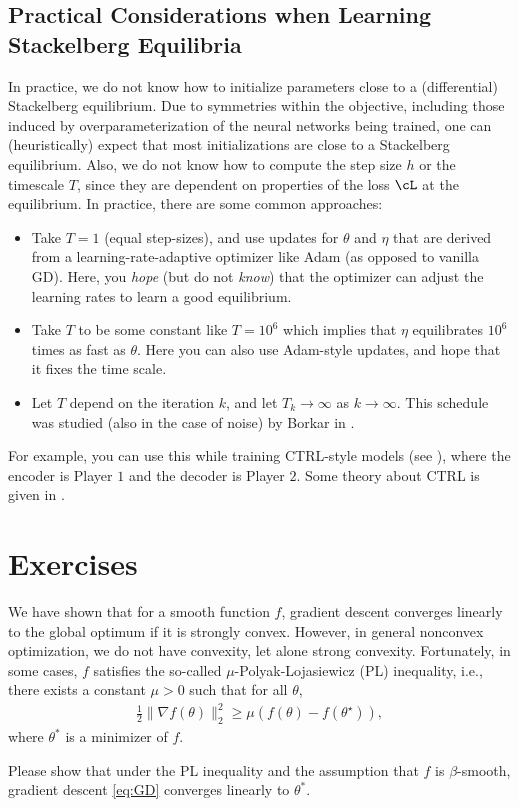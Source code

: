 \documentclass[../../book-main.tex]{subfiles}
\begin{document}
\subsection{Practical Considerations when Learning Stackelberg Equilibria}

In practice, we do not know how to initialize parameters close to a
(differential) Stackelberg equilibrium. Due to symmetries within the
objective, including those induced by overparameterization of the
neural networks being trained, one can (heuristically) expect that
most initializations are close to a Stackelberg equilibrium. Also, we
do not know how to compute the step size \(h\) or the timescale
\(T\), since they are dependent on properties of the loss \(\cL\) at
the equilibrium. In practice, there are some common approaches:
\begin{itemize}
    \item Take \(T = 1\) (equal step-sizes), and use updates for
        \(\theta\) and \(\eta\) that are derived from a
        learning-rate-adaptive optimizer like Adam (as opposed to
        vanilla GD). Here, you \textit{hope} (but do not
        \textit{know}) that the optimizer can adjust the learning
        rates to learn a good equilibrium.
    \item Take \(T\) to be some constant like \(T = 10^{6}\) which
        implies that \(\eta\) equilibrates \(10^{6}\) times as fast
        as \(\theta\). Here you can also use Adam-style updates, and
        hope that it fixes the time scale.
    \item Let \(T\) depend on the iteration \(k\), and let \(T_{k}
        \to \infty\) as \(k \to \infty\). This schedule was studied
        (also in the case of noise) by Borkar in \cite{borkar1997stochastic}.
\end{itemize}
For example, you can use this while training CTRL-style models (see
), where the encoder is Player \(1\) and the
decoder is Player \(2\). Some theory about CTRL is given in
.

\section{Exercises}

\begin{exercise}
    We have shown that for a smooth function $f$, gradient descent
    converges linearly to the global optimum if it is strongly
    convex. However, in general nonconvex optimization, we do not
    have convexity, let alone strong convexity. Fortunately, in some
    cases, $f$ satisfies the so-called $\mu$-Polyak-Lojasiewicz (PL)
    inequality, i.e., there exists a constant $\mu > 0$ such that for
    all $\theta$,
    \begin{align*}
        \frac{1}{2}\|\nabla f(\theta)\|_2^2 \ge \mu\left( f(\theta) -
        f(\theta^\star) \right),
    \end{align*}
    where $\theta^*$ is a minimizer of $f$.

    Please show that under the PL inequality and the assumption that
    $f$ is $\beta$-smooth, gradient descent \eqref{eq:GD} converges
    linearly to  $\theta^*$.
\end{exercise}
\end{document}
